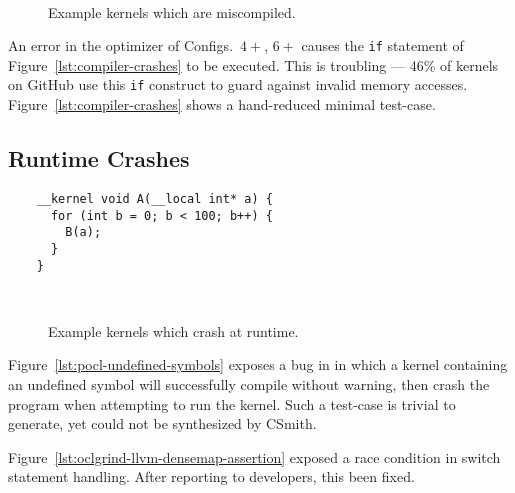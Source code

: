 \begin{figure}
  \centering %
  \\%
  \caption{Example kernels which are miscompiled.}%
  \label{lst:wrong-code}%
\end{figure}


An error in the optimizer of Configs.\ $4+$, $6+$ causes the \texttt{if} statement of Figure~\ref{lst:compiler-crashes} to be executed.
This is troubling --- 46\% of kernels on GitHub use this \texttt{if} construct to guard against invalid memory accesses. Figure~\ref{lst:compiler-crashes} shows a hand-reduced minimal test-case.


\subsection{Runtime Crashes}

\newsavebox{\PoclUndefinedSymbols}
\begin{lrbox}{\PoclUndefinedSymbols}
  \hspace{1.5em}
  \begin{lstlisting}
    __kernel void A(__local int* a) {
      for (int b = 0; b < 100; b++) {
        B(a);
      }
    }
  \end{lstlisting}
\end{lrbox}

\begin{figure}
  \centering %
  \\%
  \caption{Example kernels which crash at runtime.}%
  \label{lst:compiler-hangs}%
\end{figure}

Figure~\ref{lst:pocl-undefined-symbols} exposes a bug in in which a kernel containing an undefined symbol will successfully compile without warning, then crash the program when attempting to run the kernel. Such a test-case is trivial to generate, yet could not be synthesized by CSmith.

Figure~\ref{lst:oclgrind-llvm-densemap-assertion} exposed a race condition in switch statement handling. After reporting to developers, this been fixed.


